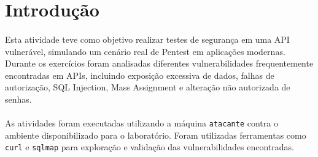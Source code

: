 \section{Introdução}

\paragraph{}
Esta atividade teve como objetivo realizar testes de segurança em uma API
vulnerável, simulando um cenário real de Pentest em aplicações modernas.
Durante os exercícios foram analisadas diferentes vulnerabilidades
frequentemente encontradas em APIs, incluindo exposição excessiva de dados,
falhas de autorização, SQL Injection, Mass Assignment e alteração não
autorizada de senhas.

\paragraph{}
As atividades foram executadas utilizando a máquina \texttt{atacante} contra o
ambiente disponibilizado para o laboratório. Foram utilizadas ferramentas como
\texttt{curl} e \texttt{sqlmap} para exploração e validação das
vulnerabilidades encontradas.
